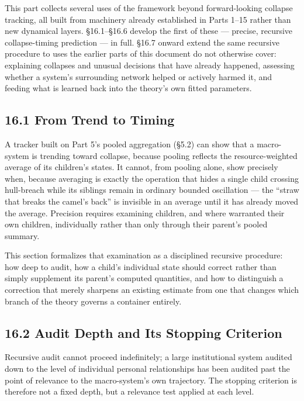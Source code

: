 \documentclass[
]{article}
\begin{document}
This part collects several uses of the framework beyond forward-looking
collapse tracking, all built from machinery already established in Parts
1--15 rather than new dynamical layers. §16.1--§16.6 develop the first
of these --- precise, recursive collapse-timing prediction --- in full.
§16.7 onward extend the same recursive procedure to uses the earlier
parts of this document do not otherwise cover: explaining collapses and
unusual decisions that have already happened, assessing whether a
system's surrounding network helped or actively harmed it, and feeding
what is learned back into the theory's own fitted parameters.

\hypertarget{from-trend-to-timing}{%
\subsection{16.1 From Trend to Timing}\label{from-trend-to-timing}}

A tracker built on Part 5's pooled aggregation (§5.2) can show that a
macro-system is trending toward collapse, because pooling reflects the
resource-weighted average of its children's states. It cannot, from
pooling alone, show precisely when, because averaging is exactly the
operation that hides a single child crossing hull-breach while its
siblings remain in ordinary bounded oscillation --- the ``straw that
breaks the camel's back'' is invisible in an average until it has
already moved the average. Precision requires examining children, and
where warranted their own children, individually rather than only
through their parent's pooled summary.

This section formalizes that examination as a disciplined recursive
procedure: how deep to audit, how a child's individual state should
correct rather than simply supplement its parent's computed quantities,
and how to distinguish a correction that merely sharpens an existing
estimate from one that changes which branch of the theory governs a
container entirely.

\hypertarget{audit-depth-and-its-stopping-criterion}{%
\subsection{16.2 Audit Depth and Its Stopping
Criterion}\label{audit-depth-and-its-stopping-criterion}}

Recursive audit cannot proceed indefinitely; a large institutional
system audited down to the level of individual personal relationships
has been audited past the point of relevance to the macro-system's own
trajectory. The stopping criterion is therefore not a fixed depth, but a
relevance test applied at each level.
\end{document}
